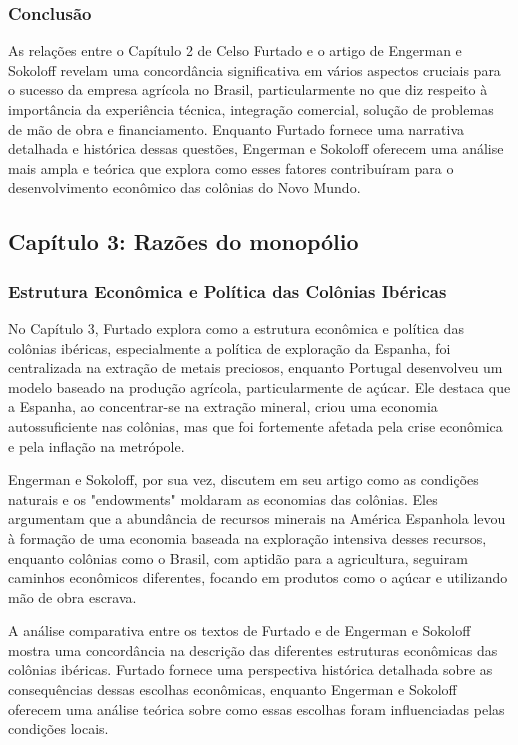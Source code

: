 \documentclass[a4paper,12pt]{article}[abntex2]
\begin{document}
\subsubsection*{Conclusão}

As relações entre o Capítulo 2 de Celso Furtado e o artigo de Engerman e Sokoloff revelam uma concordância significativa em vários aspectos cruciais para o sucesso da empresa agrícola no Brasil, particularmente no que diz respeito à importância da experiência técnica, integração comercial, solução de problemas de mão de obra e financiamento. Enquanto Furtado fornece uma narrativa detalhada e histórica dessas questões, Engerman e Sokoloff oferecem uma análise mais ampla e teórica que explora como esses fatores contribuíram para o desenvolvimento econômico das colônias do Novo Mundo.

\subsection*{\textbf{Capítulo 3: Razões do monopólio}}

\subsubsection*{Estrutura Econômica e Política das Colônias Ibéricas}

No Capítulo 3, Furtado explora como a estrutura econômica e política das colônias ibéricas, especialmente a política de exploração da Espanha, foi centralizada na extração de metais preciosos, enquanto Portugal desenvolveu um modelo baseado na produção agrícola, particularmente de açúcar. Ele destaca que a Espanha, ao concentrar-se na extração mineral, criou uma economia autossuficiente nas colônias, mas que foi fortemente afetada pela crise econômica e pela inflação na metrópole.

Engerman e Sokoloff, por sua vez, discutem em seu artigo como as condições naturais e os "endowments" moldaram as economias das colônias. Eles argumentam que a abundância de recursos minerais na América Espanhola levou à formação de uma economia baseada na exploração intensiva desses recursos, enquanto colônias como o Brasil, com aptidão para a agricultura, seguiram caminhos econômicos diferentes, focando em produtos como o açúcar e utilizando mão de obra escrava.

A análise comparativa entre os textos de Furtado e de Engerman e Sokoloff mostra uma concordância na descrição das diferentes estruturas econômicas das colônias ibéricas. Furtado fornece uma perspectiva histórica detalhada sobre as consequências dessas escolhas econômicas, enquanto Engerman e Sokoloff oferecem uma análise teórica sobre como essas escolhas foram influenciadas pelas condições locais.
\end{document}
